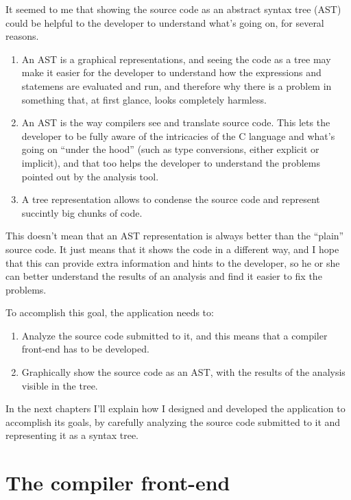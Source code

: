 \documentclass[a4paper,openany]{refrep}
\begin{document}
It seemed to me that showing the source code as an abstract syntax tree (AST) could be helpful to the developer to understand what's going on, for several reasons.

\begin{enumerate}
\item An AST is a graphical representations, and seeing the code as a tree may make it easier for the developer to understand how the expressions and statemens are evaluated and run, and therefore why there is a problem in something that, at first glance, looks completely harmless.

\item An AST is the way compilers see and translate source code. This lets the devel\-oper to be fully aware of the intricacies of the C language and what's going on ``under the hood'' (such as type conversions, either ex\-plicit or implicit), and that too helps the developer to understand the problems pointed out by the analysis tool.

\item A tree representation allows to condense the source code and represent succintly big chunks of code.
\end{enumerate}

This doesn't mean that an AST representation is always better than the ``plain'' source code. It just means that it shows the code in a different way, and I hope that this can provide extra information and hints to the developer, so he or she can better understand the results of an analysis and find it easier to fix the problems.

To accomplish this goal, the application needs to:

\begin{enumerate}
\item Analyze the source code submitted to it, and this means that a compiler front-end has to be developed.

\item Graphically show the source code as an AST, with the results of the analysis visible in the tree.
\end{enumerate}

In the next chapters I'll explain how I designed and developed the application to accomplish its goals, by carefully analyzing the source code submitted to it and representing it as a syntax tree.

\chapter{The compiler front-end}
\end{document}
